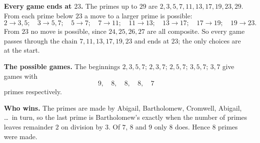 \textbf{Every game ends at $23$.} The primes up to $29$ are $2,3,5,7,11,13,17,19,23,29$. From each prime below $23$ a move to a larger prime is possible:
\[
2\to3,5;\quad 3\to5,7;\quad 5\to7;\quad 7\to11;\quad 11\to13;\quad 13\to17;\quad 17\to19;\quad 19\to23 .
\]
From $23$ no move is possible, since $24,25,26,27$ are all composite. So every game passes through the chain $7,11,13,17,19,23$ and ends at $23$; the only choices are at the start.

\textbf{The possible games.} The beginnings $2,3,5,7$; $2,3,7$; $2,5,7$; $3,5,7$; $3,7$ give games with
\[
9,\quad 8,\quad 8,\quad 8,\quad 7
\]
primes respectively.

\textbf{Who wins.} The primes are made by Abigail, Bartholomew, Cromwell, Abigail, \dots\ in turn, so the last prime is Bartholomew's exactly when the number of primes leaves remainder $2$ on division by $3$. Of $7$, $8$ and $9$ only $8$ does. Hence $\boxed{8}$ primes were made.
